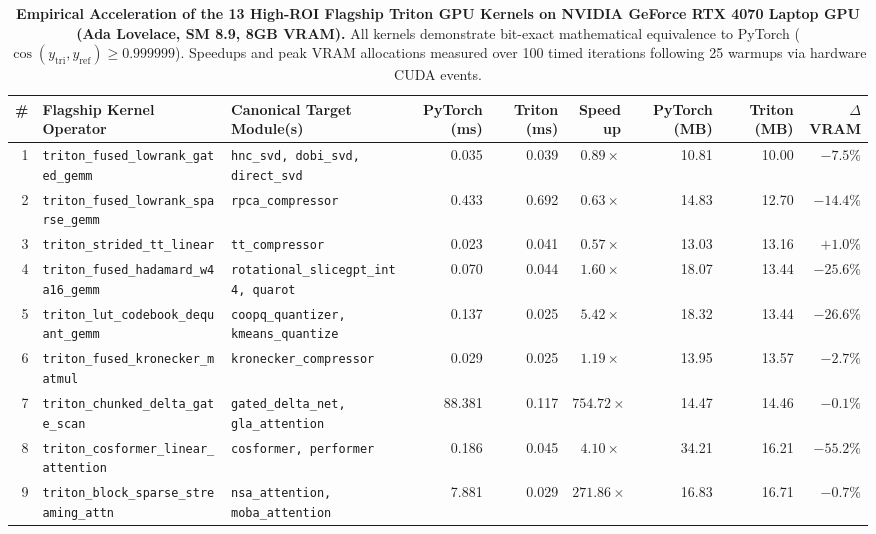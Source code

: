\begin{table}[t]
\centering
\caption{\textbf{Empirical Acceleration of the 13 High-ROI Flagship Triton GPU Kernels on NVIDIA GeForce RTX 4070 Laptop GPU (Ada Lovelace, SM 8.9, 8GB VRAM).}
All kernels demonstrate bit-exact mathematical equivalence to PyTorch ($\cos(y_{\text{tri}}, y_{\text{ref}}) \ge 0.999999$). Speedups and peak VRAM allocations measured over 100 timed iterations following 25 warmups via hardware CUDA events.}
\label{tab:flagship_triton_kernels}
\scriptsize
\setlength{\tabcolsep}{3.5pt}
\begin{tabular}{rllrrrrrr}
\toprule
\textbf{\#} & \textbf{Flagship Kernel Operator} & \textbf{Canonical Target Module(s)} & \textbf{PyTorch (ms)} & \textbf{Triton (ms)} & \textbf{Speedup} & \textbf{PyTorch (MB)} & \textbf{Triton (MB)} & \textbf{$\Delta$VRAM} \\
\midrule
1 & \texttt{triton\_fused\_lowrank\_gated\_gemm} & \texttt{hnc\_svd, dobi\_svd, direct\_svd} & 0.035 & 0.039 & $0.89\times$ & 10.81 & 10.00 & $-7.5\%$ \\
2 & \texttt{triton\_fused\_lowrank\_sparse\_gemm} & \texttt{rpca\_compressor} & 0.433 & 0.692 & $0.63\times$ & 14.83 & 12.70 & $-14.4\%$ \\
3 & \texttt{triton\_strided\_tt\_linear} & \texttt{tt\_compressor} & 0.023 & 0.041 & $0.57\times$ & 13.03 & 13.16 & $+1.0\%$ \\
4 & \texttt{triton\_fused\_hadamard\_w4a16\_gemm} & \texttt{rotational\_slicegpt\_int4, quarot} & 0.070 & 0.044 & $\mathbf{1.60\times}$ & 18.07 & 13.44 & $\mathbf{-25.6\%}$ \\
5 & \texttt{triton\_lut\_codebook\_dequant\_gemm} & \texttt{coopq\_quantizer, kmeans\_quantize} & 0.137 & 0.025 & $\mathbf{5.42\times}$ & 18.32 & 13.44 & $\mathbf{-26.6\%}$ \\
6 & \texttt{triton\_fused\_kronecker\_matmul} & \texttt{kronecker\_compressor} & 0.029 & 0.025 & $\mathbf{1.19\times}$ & 13.95 & 13.57 & $-2.7\%$ \\
7 & \texttt{triton\_chunked\_delta\_gate\_scan} & \texttt{gated\_delta\_net, gla\_attention} & 88.381 & 0.117 & $\mathbf{754.72\times}$ & 14.47 & 14.46 & $-0.1\%$ \\
8 & \texttt{triton\_cosformer\_linear\_attention} & \texttt{cosformer, performer} & 0.186 & 0.045 & $\mathbf{4.10\times}$ & 34.21 & 16.21 & $\mathbf{-55.2\%}$ \\
9 & \texttt{triton\_block\_sparse\_streaming\_attn} & \texttt{nsa\_attention, moba\_attention} & 7.881 & 0.029 & $\mathbf{271.86\times}$ & 16.83 & 16.71 & $-0.7\%$ \\

\end{tabular}
\end{table}
